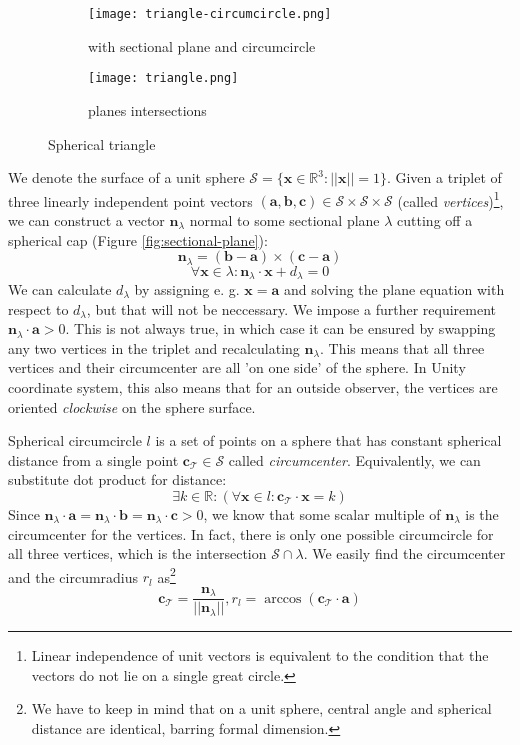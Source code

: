 \begin{figure}[ht]
\centering
\begin{subfigure}{8cm}
\texttt{[image: triangle-circumcircle.png]}
\caption{with sectional plane and circumcircle}
\label{fig:triangle-circumcircle}
\end{subfigure}
\begin{subfigure}{8cm}
\texttt{[image: triangle.png]}
\caption{planes intersections}
\label{fig:spherical-triangle-visual}
\end{subfigure}
\caption{Spherical triangle}
\label{fig:spherical-triangle}
\end{figure}

 We denote the surface of a unit sphere $\mathcal{S} =  \{\mathbf{x} \in \mathbb{R}^3: ||\mathbf{x}||=1\}$. Given a triplet of three linearly independent point vectors $(\mathbf{a},\mathbf{b},\mathbf{c})\in \mathcal{S}\times\mathcal{S}\times\mathcal{S}$ (called \textit{vertices})\footnote{Linear independence of unit vectors is equivalent to the condition that the vectors do not lie on a single great circle.}, we can construct a vector $\mathbf{n}_\lambda$ normal to some sectional plane $\lambda$ cutting off a spherical cap (Figure \ref{fig:sectional-plane}):
 $$\mathbf{n}_\lambda=(\mathbf{b} - \mathbf{a})\times(\mathbf{c} - \mathbf{a})$$
$$\forall\mathbf{x}\in\lambda: \mathbf{n}_\lambda\cdot\mathbf{x}+d_\lambda=0$$
We can calculate $d_\lambda$ by assigning e. g. $\mathbf{x}=\mathbf{a}$ and solving the plane equation with respect to $d_\lambda$, but that will not be neccessary. We impose a further requirement $\mathbf{n}_\lambda\cdot\mathbf{a}>0$. This is not always true, in which case it can be ensured by swapping any two vertices in the triplet and recalculating $\mathbf{n}_\lambda$. This means that all three vertices and their circumcenter are all 'on one side' of the sphere. In Unity coordinate system, this also means that for an outside observer, the vertices are oriented \textit{clockwise} on the sphere surface.

Spherical circumcircle $l$ is a set of points on a sphere that has constant spherical distance from a single point $\mathbf{c}_\mathcal{T}\in\mathcal{S}$ called \textit{circumcenter}. Equivalently, we can substitute dot product for distance:
$$\exists k\in\mathbb{R}:(\forall\mathbf{x}\in l:\mathbf{c}_\mathcal{T}\cdot\mathbf{x}=k)$$
Since $\mathbf{n}_\lambda\cdot\mathbf{a}=\mathbf{n}_\lambda\cdot\mathbf{b}=\mathbf{n}_\lambda\cdot\mathbf{c}>0$, we know that some scalar multiple of $\mathbf{n}_\lambda$ is the circumcenter for the vertices. In fact, there is only one possible circumcircle for all three vertices, which is the intersection $\mathcal{S}\cap\lambda$. We easily find the circumcenter and the circumradius $r_l$ as\footnote{We have to keep in mind that on a unit sphere, central angle and spherical distance are identical, barring formal dimension.}
$$\mathbf{c}_\mathcal{T}=\frac{\mathbf{n}_\lambda}{||\mathbf{n}_\lambda||}, r_l=\arccos(\mathbf{c}_\mathcal{T}\cdot\mathbf{a})$$

